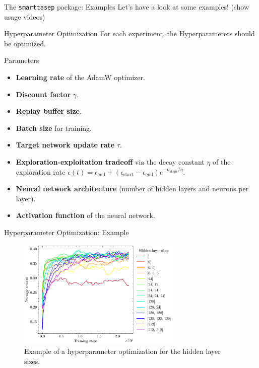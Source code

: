 \documentclass[10pt,xcolor=table, aspectratio=1610]{beamer}
\begin{document}
\begin{frame}{The \texttt{smarttasep} package: Examples}
Let's have a look at some examples! (show usage videos)
\end{frame}

\begin{frame}{Hyperparameter Optimization}
  For each experiment, the Hyperparameters should be optimized. 
    \begin{block}{Parameters}
      \begin{itemize}
        \item \textbf{Learning rate} of the AdamW optimizer.
        \item \textbf{Discount factor} $\gamma$.
        \item \textbf{Replay buffer size}.
        \item \textbf{Batch size} for training.
        \item \textbf{Target network update rate} $\tau$.
        \item \textbf{Exploration-exploitation tradeoff} via the decay constant $\eta$ of the exploration rate $\epsilon(t)=\epsilon_{\text{end}} + (\epsilon_{\text{start}} - \epsilon_{\text{end}}) e^{-n_{\text{steps}}/\eta}$.
        \item \textbf{Neural network architecture} (number of hidden layers and neurons per layer).
        \item \textbf{Activation function} of the neural network.
    \end{itemize}
    \end{block}
\end{frame}

\begin{frame}{Hyperparameter Optimization: Example}
  \begin{figure}
    \includegraphics[width=0.7\textwidth]{img/hyperparam_optim_hidden_layer_sizes.pdf}
    \caption*{\hspace{2cm} Example of a hyperparameter optimization for the hidden layer sizes.}
  \end{figure}
\end{frame}
\end{document}
